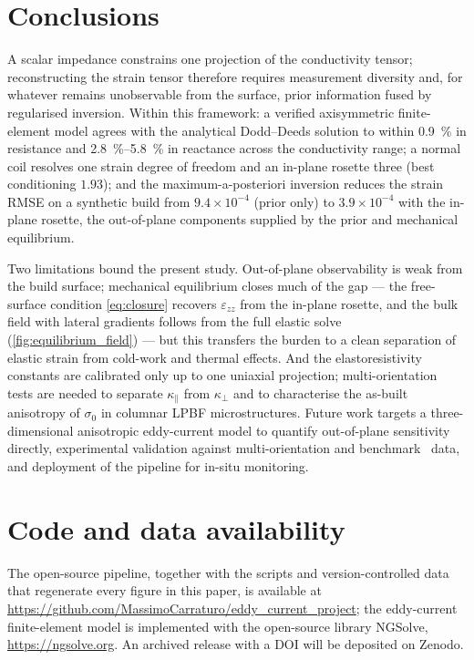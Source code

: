 \documentclass[preprint]{elsarticle}
\begin{document}
\section{Conclusions}\label{sec:conclusions}
A scalar impedance constrains one projection of the conductivity tensor;
reconstructing the strain tensor therefore requires measurement diversity and,
for whatever remains unobservable from the surface, prior information fused by
regularised inversion. Within this framework: a verified axisymmetric
finite-element model agrees with the analytical Dodd--Deeds solution to within
\SI{0.9}{\percent} in resistance and \SIrange{2.8}{5.8}{\percent} in reactance
across the conductivity range; a normal
coil resolves one strain degree of freedom and an in-plane rosette three (best
conditioning $1.93$); and the maximum-a-posteriori inversion reduces the strain
RMSE on a synthetic build from $9.4\times10^{-4}$ (prior only) to
$3.9\times10^{-4}$ with the in-plane rosette, the out-of-plane components
supplied by the prior and mechanical equilibrium.

Two limitations bound the present study. Out-of-plane observability is weak from
the build surface; mechanical equilibrium closes much of the gap --- the
free-surface condition \eqref{eq:closure} recovers $\varepsilon_{zz}$ from the
in-plane rosette, and the bulk field with lateral gradients follows from the full
elastic solve (\cref{fig:equilibrium_field}) --- but this transfers the burden to
a clean separation of elastic
strain from cold-work and thermal effects. And the elastoresistivity constants
are calibrated
only up to one uniaxial projection; multi-orientation tests are needed to
separate $\kappa_\parallel$ from $\kappa_\perp$ and to characterise the
as-built anisotropy of $\sigma_0$ in columnar LPBF microstructures. Future
work targets a three-dimensional anisotropic eddy-current model to quantify
out-of-plane sensitivity directly, experimental validation against
multi-orientation and benchmark~\cite{burke1988} data, and deployment of the
pipeline for in-situ monitoring.

\section*{Code and data availability}
\begin{sloppypar}
The open-source pipeline, together with the scripts and version-controlled
data that regenerate every figure in this paper, is available at
\url{https://github.com/MassimoCarraturo/eddy_current_project}; the
eddy-current finite-element model is implemented with the open-source library
NGSolve, \url{https://ngsolve.org}. An archived release with a DOI will be
deposited on Zenodo.
\end{sloppypar}
\end{document}

